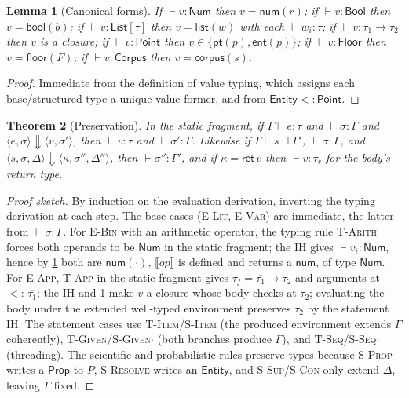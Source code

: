 \documentclass[11pt,a4paper]{article}
\theoremstyle{plain}
\newtheorem{theorem}{Theorem}[section]
\newtheorem{lemma}[theorem]{Lemma}
\theoremstyle{definition}
\theoremstyle{remark}
\newcommand{\rn}[1]{\textsc{#1}}                          %
\newcommand{\sem}[1]{\ensuremath{\llbracket #1 \rrbracket}} %
\newcommand{\evalto}{\Downarrow}
\newcommand{\env}{\sigma}
\newcommand{\subtype}{<:}
\newcommand{\Gam}{\Gamma}
\newcommand{\ret}{\mathsf{ret}}
\begin{document}
\begin{lemma}[Canonical forms]
\label{lem:canonical}
If $\vdash v:\mathsf{Num}$ then $v=\mathsf{num}(r)$; if
$\vdash v:\mathsf{Bool}$ then $v=\mathsf{bool}(b)$; if
$\vdash v:\mathsf{List}[\tau]$ then $v=\mathsf{list}(\overline w)$ with each
$\vdash w_i:\tau$; if $\vdash v:\tau_1\to\tau_2$ then $v$ is a closure; if
$\vdash v:\mathsf{Point}$ then $v\in\{\mathsf{pt}(p),\mathsf{ent}(p)\}$; if
$\vdash v:\mathsf{Floor}$ then $v=\mathsf{floor}(F)$; if
$\vdash v:\mathsf{Corpus}$ then $v=\mathsf{corpus}(s)$.
\end{lemma}
\begin{proof}
Immediate from the definition of value typing, which assigns each base/structured
type a unique value former, and from $\mathsf{Entity}\subtype\mathsf{Point}$.
\end{proof}

\begin{theorem}[Preservation]
\label{thm:preservation}
In the static fragment, if $\Gam\vdash e:\tau$ and $\vdash\env:\Gam$ and
$\langle e,\env\rangle\evalto\langle v,\env'\rangle$, then $\vdash v:\tau$ and
$\vdash\env':\Gam$. Likewise if $\Gam\vdash s\dashv\Gam'$, $\vdash\env:\Gam$,
and $\langle s,\env,\Delta\rangle\evalto\langle\kappa,\env'',\Delta''\rangle$,
then $\vdash\env'':\Gam'$, and if $\kappa=\ret\,v$ then $\vdash v:\tau_r$ for the
body's return type.
\end{theorem}
\begin{proof}[Proof sketch]
By induction on the evaluation derivation, inverting the typing derivation at
each step. The base cases (\rn{E-Lit}, \rn{E-Var}) are immediate, the latter
from $\vdash\env:\Gam$. For \rn{E-Bin} with an arithmetic operator, the typing
rule \rn{T-Arith} forces both operands to be $\mathsf{Num}$ in the static
fragment; the IH gives $\vdash v_i:\mathsf{Num}$, hence by
\cref{lem:canonical} both are $\mathsf{num}(\cdot)$, $\sem{op}$ is defined and
returns a $\mathsf{num}$, of type $\mathsf{Num}$. For \rn{E-App}, \rn{T-App} in
the static fragment gives $\tau_f=\overline{\tau_1}\to\tau_2$ and arguments at
$\subtype\,\overline{\tau_1}$; the IH and \cref{lem:canonical} make $v$ a
closure whose body checks at $\tau_2$; evaluating the body under the extended
well-typed environment preserves $\tau_2$ by the statement IH. The statement
cases use \rn{T-Item}/\rn{S-Item} (the produced environment extends $\Gam$
coherently), \rn{T-Given}/\rn{S-Given$\cdot$} (both branches produce $\Gam$),
and \rn{T-Seq}/\rn{S-Seq$\cdot$} (threading). The scientific and probabilistic
rules preserve types because \rn{S-Prop} writes a $\mathsf{Prop}$ to $P$,
\rn{S-Resolve} writes an $\mathsf{Entity}$, and \rn{S-Sup}/\rn{S-Con} only
extend $\Delta$, leaving $\Gam$ fixed.
\end{proof}
\end{document}
